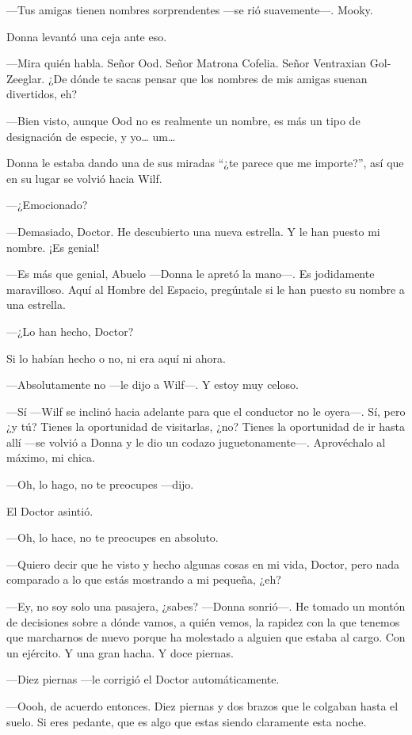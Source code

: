 ---Tus amigas tienen nombres sorprendentes ---se rió suavemente---.
Mooky.

Donna levantó una ceja ante eso.

---Mira quién habla. Señor Ood. Señor Matrona Cofelia. Señor Ventraxian
Gol-Zeeglar. ¿De dónde te sacas pensar que los nombres de mis amigas
suenan divertidos, eh?

---Bien visto, aunque Ood no es realmente un nombre, es más un tipo de
designación de especie, y yo\ldots{} um\ldots{}

Donna le estaba dando una de sus miradas ``¿te parece que me importe?'',
así que en su lugar se volvió hacia Wilf.

---¿Emocionado?

---Demasiado, Doctor. He descubierto una nueva estrella. Y le han puesto
mi nombre. ¡Es genial!

---Es más que genial, Abuelo ---Donna le apretó la mano---. Es
jodidamente maravilloso. Aquí al Hombre del Espacio, pregúntale si le
han puesto su nombre a una estrella.

---¿Lo han hecho, Doctor?

Si lo habían hecho o no, ni era aquí ni ahora.

---Absolutamente no ---le dijo a Wilf---. Y estoy muy celoso.

---Sí ---Wilf se inclinó hacia adelante para que el conductor no le
oyera---. Sí, pero ¿y tú? Tienes la oportunidad de visitarlas, ¿no?
Tienes la oportunidad de ir hasta allí ---se volvió a Donna y le dio un
codazo juguetonamente---. Aprovéchalo al máximo, mi chica.

---Oh, lo hago, no te preocupes ---dijo.

El Doctor asintió.

---Oh, lo hace, no te preocupes en absoluto.

---Quiero decir que he visto y hecho algunas cosas en mi vida, Doctor,
pero nada comparado a lo que estás mostrando a mi pequeña, ¿eh?

---Ey, no soy solo una pasajera, ¿sabes? ---Donna sonrió---. He tomado
un montón de decisiones sobre a dónde vamos, a quién vemos, la rapidez
con la que tenemos que marcharnos de nuevo porque ha molestado a alguien
que estaba al cargo. Con un ejército. Y una gran hacha. Y doce piernas.

---Diez piernas ---le corrigió el Doctor automáticamente.

---Oooh, de acuerdo entonces. Diez piernas y dos brazos que le colgaban
hasta el suelo. Si eres pedante, que es algo que estas siendo claramente
esta noche.

